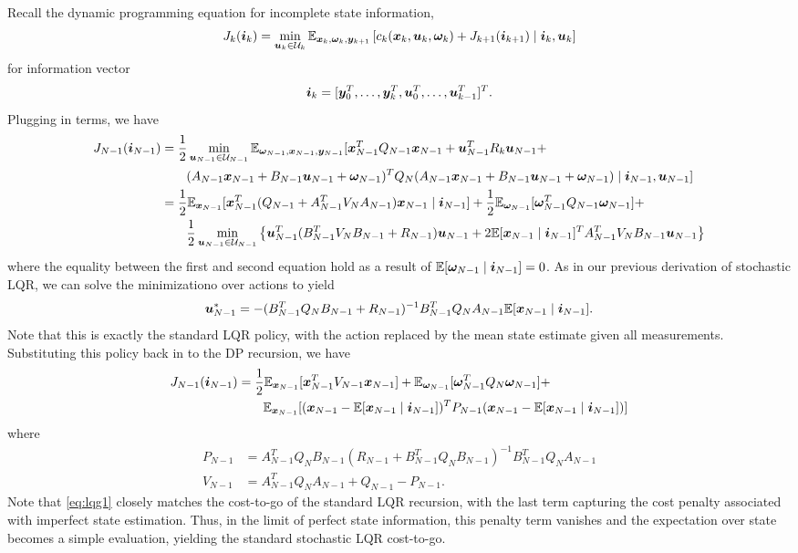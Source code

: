 Recall the dynamic programming equation for incomplete state information, 
\begin{equation}
    J_k(\bm{i}_k) = \min_{\bm{u}_k \in \mathcal{U}_k} \mathbb{E}_{\bm{x}_k, \bm{\omega}_k, \bm{y}_{k+1}} \left[ c_k(\bm{x}_k,\bm{u}_k,\bm{\omega}_k) + J_{k+1}(\bm{i}_{k+1}) \mid \bm{i}_k, \bm{u}_k \right]
\end{equation}
for information vector
\begin{equation}
    \bm{i}_k = [\bm{y}_0^T, \ldots, \bm{y}_k^T, \bm{u}_0^T, \ldots, \bm{u}_{k-1}^T]^T.
\end{equation}
Plugging in terms, we have
\begin{align}
    J_{N-1}(\bm{i}_{N-1}) &= \frac{1}{2} \min_{\bm{u}_{N-1} \in \mathcal{U}_{N-1}} \mathbb{E}_{\bm{\omega}_{N-1}, \bm{x}_{N-1}, \bm{y}_{N-1}} \large[ \bm{x}_{N-1}^T Q_{N-1} \bm{x}_{N-1} + \bm{u}_{N-1}^T R_k \bm{u}_{N-1} + \\
    &\qquad (A_{N-1} \bm{x}_{N-1} + B_{N-1} \bm{u}_{N-1} + \bm{\omega}_{N-1})^T Q_{N} (A_{N-1} \bm{x}_{N-1} + B_{N-1} \bm{u}_{N-1} + \bm{\omega}_{N-1}) \mid \bm{i}_{N-1}, \bm{u}_{N-1} \large]\nonumber\\
    &= \frac{1}{2} \mathbb{E}_{\bm{x}_{N-1}} \large[ \bm{x}_{N-1}^T (Q_{N-1} + A_{N-1}^T V_{N} A_{N-1}) \bm{x}_{N-1} \mid \bm{i}_{N-1} \large] +  \frac{1}{2} \mathbb{E}_{\bm{\omega}_{N-1}} \large[ \bm{\omega}_{N-1}^T Q_{N-1} \bm{\omega}_{N-1}] + \nonumber\\
    & \qquad \frac{1}{2} \min_{\bm{u}_{N-1} \in \mathcal{U}_{N-1}} \left\{ \bm{u}_{N-1}^T (B_{N-1}^T V_{N} B_{N-1} + R_{N-1}) \bm{u}_{N-1} + 2 \mathbb{E}[\bm{x}_{N-1} \mid \bm{i}_{N-1}]^T A_{N-1}^T V_{N} B_{N-1} \bm{u}_{N-1} \right\}\nonumber
\end{align}
where the equality between the first and second equation hold as a result of $\mathbb{E}[\bm{\omega}_{N-1} \mid \bm{i}_{N-1}] = 0$.
As in our previous derivation of stochastic LQR, we can solve the minimizationo over actions to yield 
\begin{equation}
    \bm{u}_{N-1}^* = - (B_{N-1}^T Q_N B_{N-1} + R_{N-1})^{-1} B_{N-1}^T Q_N A_{N-1} \mathbb{E}[\bm{x}_{N-1} \mid \bm{i}_{N-1}].
\end{equation}
Note that this is exactly the standard LQR policy, with the action replaced by the mean state estimate given all measurements. Substituting this policy back in to the DP recursion, we have
\begin{align}
    J_{N-1}(\bm{i}_{N-1}) &= \frac{1}{2}  \mathbb{E}_{\bm{x}_{N-1}}[ \bm{x}_{N-1}^T V_{N-1} \bm{x}_{N-1}]  + \mathbb{E}_{\bm{\omega}_{N-1}}\large[ \bm{\omega}_{N-1}^T Q_{N} \bm{\omega}_{N-1}] + \label{eq:lqg1}\\
    &\qquad \mathbb{E}_{\bm{x}_{N-1}}[ (\bm{x}_{N-1} - \mathbb{E}[\bm{x}_{N-1} \mid \bm{i}_{N-1}])^T P_{N-1} (\bm{x}_{N-1} - \mathbb{E}[\bm{x}_{N-1} \mid \bm{i}_{N-1}])] \nonumber
\end{align}
where
\begin{align}
    P_{N-1} &= A^T_{N-1} Q_N B_{N-1} (R_{N-1} + B^T_{N-1} Q_N B_{N-1})^{-1} B^T_{N-1} Q_N A_{N-1}\\
    V_{N-1} &= A_{N-1}^T Q_N A_{N-1} + Q_{N-1} - P_{N-1}.
\end{align}
Note that \eqref{eq:lqg1} closely matches the cost-to-go of the standard LQR recursion, with the last term capturing the cost penalty associated with imperfect state estimation. Thus, in the limit of perfect state information, this penalty term vanishes and the expectation over state becomes a simple evaluation, yielding the standard stochastic LQR cost-to-go.

